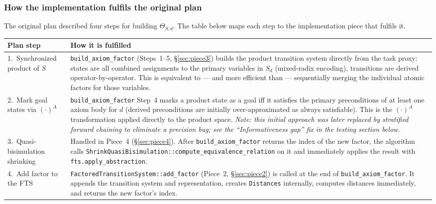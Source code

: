 \documentclass[11pt,a4paper]{article}
\begin{document}
\subsubsection*{How the implementation fulfils the original plan}

The original plan described four steps for building $\Theta_{S,d}$.  The
table below maps each step to the implementation piece that fulfils it.

\begin{center}
\begin{tabular}{lp{9cm}}
\toprule
\textbf{Plan step} & \textbf{How it is fulfilled} \\
\midrule
1.\ Synchronized product of $S$ &
  \texttt{build\_axiom\_factor} (Steps~1--5, \S\ref{sec:piece3}) builds the
  product transition system directly from the task proxy: states are all
  combined assignments to the primary variables in $S_d$ (mixed-radix
  encoding), transitions are derived operator-by-operator.  This is equivalent
  to --- and more efficient than --- sequentially merging the individual atomic
  factors for those variables. \\[4pt]
2.\ Mark goal states via $(\cdot)^A$ &
  \texttt{build\_axiom\_factor} Step~4 marks a product state as a goal iff it
  satisfies the primary preconditions of at least one axiom body for $d$
  (derived preconditions are initially over-approximated as always satisfiable).
  This is the $(\cdot)^A$ transformation applied directly to the product space.
  \emph{Note: this initial approach was later replaced by stratified forward
  chaining to eliminate a precision bug; see the ``Informativeness gap'' fix
  in the testing section below.} \\[4pt]
3.\ Quasi-bisimulation shrinking &
  Handled in Piece~4 (\S\ref{sec:piece4}).  After \texttt{build\_axiom\_factor}
  returns the index of the new factor, the algorithm calls
  \texttt{ShrinkQuasiBisimulation::compute\_equivalence\_relation} on it and
  immediately applies the result with \texttt{fts.apply\_abstraction}. \\[4pt]
4.\ Add factor to the FTS &
  \texttt{FactoredTransitionSystem::add\_factor} (Piece~2, \S\ref{sec:piece2})
  is called at the end of \texttt{build\_axiom\_factor}.  It appends the
  transition system and representation, creates \texttt{Distances} internally,
  computes distances immediately, and returns the new factor's index. \\
\bottomrule
\end{tabular}
\end{center}
\end{document}
